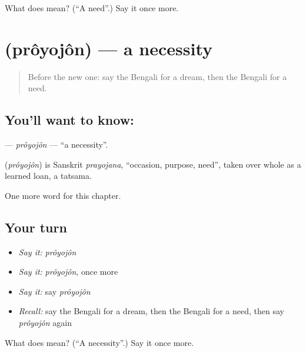\begin{tcolorbox}[breakable,colback=teal!4,colframe=teal!35!black,title={Before you move on}]
What does  mean? (\textquotedblleft{}A need\textquotedblright{}.) Say it once more.
\end{tcolorbox}
\section[\texorpdfstring{\bn{প্রয়োজন} (prôyojôn)}{প্রয়োজন (prôyojôn)}]{ (prôyojôn) — a necessity}

\label{lesson:BN-C96-proyojon}



\begin{quote}
Before the new one: say the Bengali for a dream, then the Bengali for a need.
\end{quote}

\subsection*{You'll want to know: }
\textbf{} — \emph{prôyojôn} — \textquotedblleft{}a necessity\textquotedblright{}.

\begin{cousinweb}
\textbf{} (\emph{prôyojôn}) is Sanskrit \emph{prayojana}, \textquotedblleft{}occasion, purpose, need\textquotedblright{}, taken over whole as a learned loan, a tatsama.
\end{cousinweb}

\begin{grammarlens}[title={What you've built}]
One more word for this chapter.
\end{grammarlens}

\subsection*{Your turn}
\begin{itemize}
\raggedright
  \item \emph{Say it:} \emph{prôyojôn}
  \item \emph{Say it:} \emph{prôyojôn}, once more
  \item \emph{Say it:} say \emph{prôyojôn}
  \item \emph{Recall:} say the Bengali for a dream, then the Bengali for a need, then say \emph{prôyojôn} again
\end{itemize}

\begin{tcolorbox}[breakable,colback=teal!4,colframe=teal!35!black,title={Before you move on}]
What does  mean? (\textquotedblleft{}A necessity\textquotedblright{}.) Say it once more.
\end{tcolorbox}
